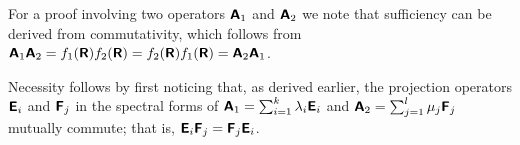 {\color{OliveGreen}\bproof
For a proof involving two operators $\textsf{\textbf{A}}_1$ and $\textsf{\textbf{A}}_2$ we note that
sufficiency  can be derived from   commutativity, which follows from
$
\textsf{\textbf{A}}_1\textsf{\textbf{A}}_2=f_1 (\textsf{\textbf{R}}) f_2 (\textsf{\textbf{R}}) =
f_2 (\textsf{\textbf{R}}) f_1 (\textsf{\textbf{R}})= \textsf{\textbf{A}}_2\textsf{\textbf{A}}_1
$.

Necessity follows by first noticing that, as derived earlier, the projection operators
$\textsf{\textbf{E}}_i$ and $\textsf{\textbf{F}}_j$
in the spectral forms of $\textsf{\textbf{A}}_1=\sum_{i=1}^k \lambda_i\textsf{\textbf{E}}_i$
and
$\textsf{\textbf{A}}_2=\sum_{j=1}^l \mu_j\textsf{\textbf{F}}_j$ mutually commute; that is,
$
\textsf{\textbf{E}}_i \textsf{\textbf{F}}_j
=
\textsf{\textbf{F}}_j \textsf{\textbf{E}}_i
$.

}
